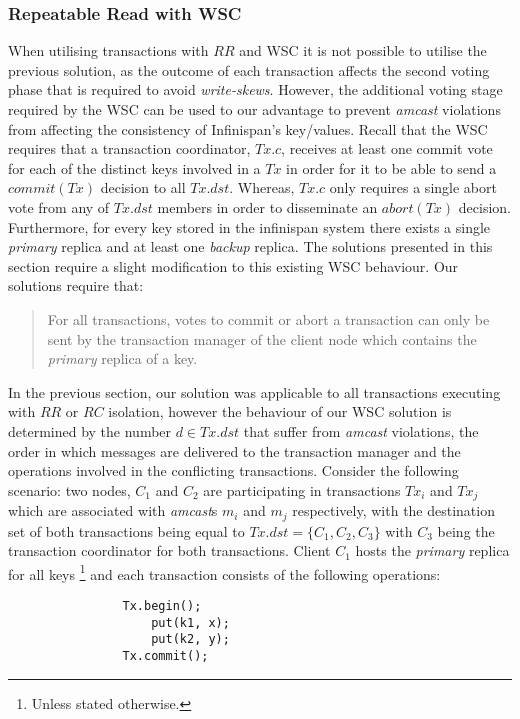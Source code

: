     \subsubsection*{Repeatable Read with WSC}
    When utilising transactions with $RR$ and WSC it is not possible to utilise the previous solution, as the outcome of each transaction affects the second voting phase that is required to avoid \emph{write-skews}.  However, the additional voting stage required by the WSC can be used to our advantage to prevent \emph{amcast} violations from affecting the consistency of Infinispan's key/values.  Recall that the WSC requires that a transaction coordinator, $Tx.c$, receives at least one commit vote for each of the distinct keys involved in a $Tx$ in order for it to be able to send a $commit(Tx)$ decision to all $Tx.dst$.  Whereas, $Tx.c$ only requires a single abort vote from any of $Tx.dst$ members in order to disseminate an $abort(Tx)$ decision.  Furthermore, for every key stored in the infinispan system there exists a single \emph{primary} replica and at least one \emph{backup} replica.  The solutions presented in this section require a slight modification to this existing WSC behaviour.  Our solutions require that: 

\begin{quotation}    
    For all transactions, votes to commit or abort a transaction can only be sent by the transaction manager of the client node which contains the \emph{primary} replica of a key.  
\end{quotation}

     In the previous section, our solution was applicable to all transactions executing with $RR$ or $RC$ isolation, however the behaviour of our WSC solution is determined by the number $d \in Tx.dst$ that suffer from \emph{amcast} violations, the order in which messages are delivered to the transaction manager and the operations involved in the conflicting transactions.  Consider the following scenario: two nodes, $C_1$ and $C_2$ are participating in transactions $Tx_i$ and $Tx_j$ which are associated with \emph{amcast}s $m_i$ and $m_j$ respectively, with the destination set of both transactions being equal to $Tx.dst = \{C_1, C_2, C_3\}$ with $C_3$ being the transaction coordinator for both transactions.  Client $C_1$ hosts the \emph{primary} replica for all keys \footnote{Unless stated otherwise.} and each transaction consists of the following operations:
    
    \begin{lstlisting}
		    	Tx.begin();
		    	    put(k1, x);
		    	    put(k2, y);
		    	Tx.commit();
    \end{lstlisting}
    
